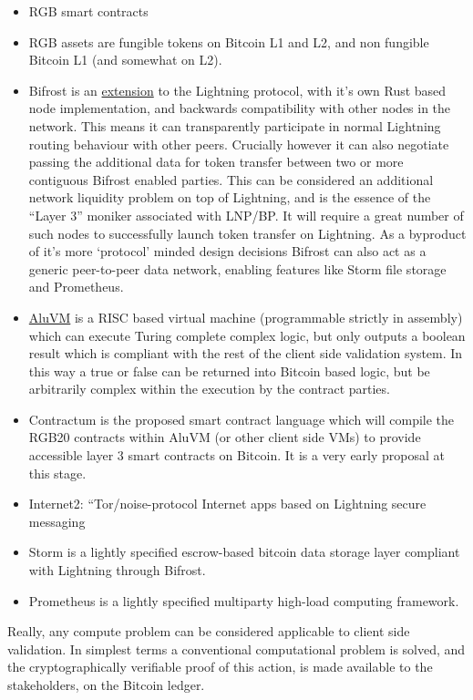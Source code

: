 \begin{itemize}
\item RGB smart contracts
\item RGB assets are fungible tokens on Bitcoin L1 and L2, and non fungible Bitcoin L1 (and somewhat on L2).
\item Bifrost is an \href{https://github.com/LNP-BP/presentations/blob/master/Presentation slides/Bifrost.pdf}{extension} to the Lightning protocol, with it's own Rust based node implementation, and backwards compatibility with other nodes in the network. This means it can transparently participate in normal Lightning routing behaviour with other peers. Crucially however it can also negotiate passing the additional data for token transfer between two or more contiguous Bifrost enabled parties. This can be considered an additional network liquidity problem on top of Lightning, and is the essence of the ``Layer 3'' moniker associated with LNP/BP. It will require a great number of such nodes to successfully launch token transfer on Lightning. As a byproduct of it's more `protocol' minded design decisions Bifrost can also act as a generic peer-to-peer data network, enabling features like Storm file storage and Prometheus.
\item \href{https://www.aluvm.org/}{AluVM} is a RISC based virtual machine (programmable strictly in assembly) which can execute Turing complete complex logic, but only outputs a boolean result which is compliant with the rest of the client side validation system. In this way a true or false can be returned into Bitcoin based logic, but be arbitrarily complex within the execution by the contract parties.
\item Contractum is the proposed smart contract language which will compile the RGB20 contracts within AluVM (or other client side VMs) to provide accessible layer 3 smart contracts on Bitcoin. It is a very early proposal at this stage.
\item  Internet2: ``Tor/noise-protocol Internet apps based on Lightning secure messaging
\item Storm is a lightly specified escrow-based bitcoin data storage layer compliant with Lightning through Bifrost.
\item Prometheus is a lightly specified multiparty high-load computing framework.
\end{itemize}
Really, any compute problem can be considered applicable to client side validation. In simplest terms a conventional computational problem is solved, and the cryptographically verifiable proof of this action, is made available to the stakeholders, on the Bitcoin ledger.\par 
